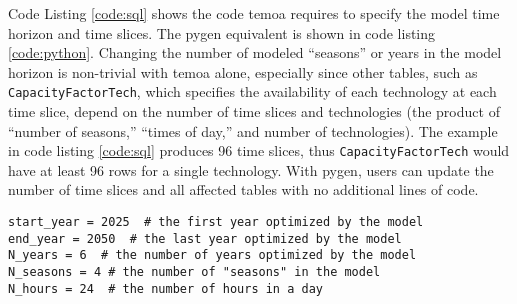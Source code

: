 



\label{app:pygen}
Code Listing \ref{code:sql} shows
the code \gls{temoa} requires to specify the model time horizon and time slices.
The \gls{pygen} equivalent is shown in code listing \ref{code:python}. Changing
the number of modeled ``seasons'' or years in the model horizon is non-trivial with
\gls{temoa} alone, especially since other tables, such as \texttt{CapacityFactorTech},
which specifies the availability of each technology at each time slice, depend
on the number of time slices and technologies (the product of ``number of seasons,''
``times of day,'' and number of technologies).
The example in code listing \ref{code:sql} produces 96 time slices, thus \texttt{CapacityFactorTech}
would have at least 96 rows for a single technology. With \gls{pygen}, users can
update the number of time slices and all affected tables with no additional lines
of code.




\begin{lstlisting}[style=pythonstyle, caption={Equivalent \gls{pygen} code to specify the model horizon and time slices.}, label={code:python}, floatplacement=H]
start_year = 2025  # the first year optimized by the model
end_year = 2050  # the last year optimized by the model
N_years = 6  # the number of years optimized by the model
N_seasons = 4 # the number of "seasons" in the model
N_hours = 24  # the number of hours in a day
\end{lstlisting}

